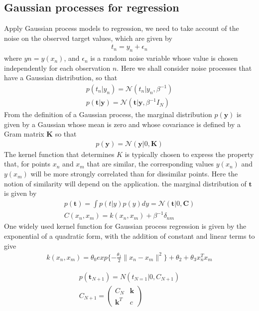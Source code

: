 \documentclass[a4paper]{article}
\begin{document}
\subsection{Gaussian processes for regression}
Apply Gaussian process models to regression, we need to take account of the noise on the observed target values, which are given by
\begin{align}
t_n = y_n + \epsilon_n
\end{align}
where $yn = y(x_n)$, and $\epsilon_n$ is a random noise variable whose
value is chosen independently for each observation $n$. Here we shall
consider noise processes that have a Gaussian distribution, so that
\begin{align}
p(t_n|y_n) =  \mathcal{N}(t_n|y_n, \beta^{-1})\\
p(\mathbf{t}|\mathbf{y}) =  \mathcal{N}(\mathbf{t}|\mathbf{y}, \beta^{-1}\mathit{I}_N)
\end{align}
From the deﬁnition of a Gaussian process, the marginal distribution
$p(\mathbf{y})$ is given by a Gaussian whose mean is zero and whose covariance is deﬁned by a Gram matrix $\mathbf{K}$ so that
\begin{align}
p(\mathbf{y}) = \mathcal{N}(\mathbf{y}|0, \mathbf{K})
\end{align}
The kernel function that determines $K$ is typically chosen to express the property
that, for points $x_n$ and $x_m$ that are similar, the corresponding
values $y(x_n)$ and $y(x_m)$ will be more strongly correlated than for
dissimilar points. Here the notion of similarity will depend on the application.
the marginal distribution of $\mathbf{t}$ is given by
\begin{align}
p(\mathbf{t}) = \int p(t|y)p(y)dy = \mathcal{N}(\mathbf{t}|0, \mathbf{C})\\
C(x_n, x_m) = k(x_n, x_m) + \beta^{-1} \delta_{nm}
\end{align}
One widely used kernel function for Gaussian process regression is
given by the exponential of a quadratic form, with the addition of
constant and linear terms to give
\begin{align}
k(x_n, x_m) = \theta_0 exp\{ -\frac{\theta_1}{2}\|x_n-x_m\|^2\} +
  \theta_2 + \theta_3x_n^Tx_m
\end{align}

\begin{align}
p(\mathbf{t}_{N+1}) = N(t_{N=1}|0, C_{N+1})\\
C_{N+1} =
 \begin{pmatrix}
  C_{N} & \mathbf{k}\\
  \mathbf{k}^T & c
 \end{pmatrix}
\end{align}
\end{document}
